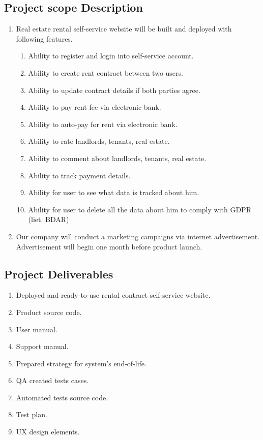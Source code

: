 \documentclass{VUMIFPSkursinis}
\begin{document}
	\subsection{Project scope Description}
		\begin{enumerate}
			\item{Real estate rental self-service website will be built and deployed with following features.}
				\begin{enumerate}
					\item{Ability to register and login into self-service account.}
					\item{Ability to create rent contract between two users.}
					\item{Ability to update contract details if both parties agree.}
					\item{Ability to pay rent fee via electronic bank.}
					\item{Ability to auto-pay for rent via electronic bank.}
					\item{Ability to rate landlords, tenants, real estate.}
					\item{Ability to comment about landlords, tenants, real estate.}
					\item{Ability to track payment details.}
					\item{Ability for user to see what data is tracked about him.}
					\item{Ability for user to delete all the data about him to comply with GDPR (liet. BDAR)}
				\end{enumerate}
			\item{Our company will conduct a marketing campaigns via internet advertisement. Advertisement will begin one month before product launch.}
		\end{enumerate}

	\subsection{Project Deliverables}
		\begin{enumerate}
			\item{Deployed and ready-to-use rental contract self-service website.}
			\item{Product source code.}
			\item{User manual.}
			\item{Support manual.}
			\item{Prepared strategy for system's end-of-life.}
			\item{QA created tests cases.}
			\item{Automated tests source code.}
			\item{Test plan.}
			\item{UX design elements.}
		\end{enumerate}
\end{document}
